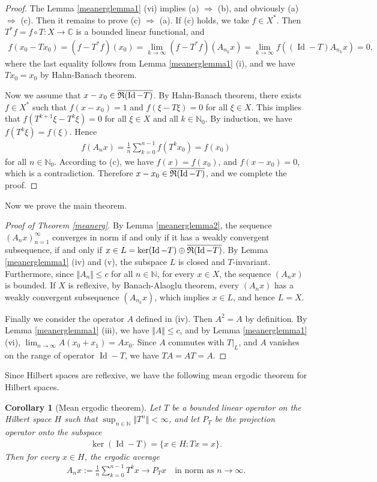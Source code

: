 \documentclass{article}
\numberwithin{equation}{section}
\newcommand{\bbC}{\mathbb{C}}
\newcommand{\bbN}{\mathbb{N}}
\newcommand{\ol}{\overline}
\DeclareMathOperator{\id}{Id}
\theoremstyle{plain}
\newtheorem{corollary}[theorem]{Corollary}
\theoremstyle{definition}
\begin{document}
\begin{proof}
The Lemma \ref{meanerglemma1} (vi) implies (a) $\Rightarrow$ (b), and obviously (a) $\Rightarrow$ (c). Then it remains to prove (c) $\Rightarrow$ (a). If (c) holds, we take $f\in X^*$. Then $T^*f=f\circ T:X\to\bbC$ is a bounded linear functional, and
\begin{align*}
	f(x_0-Tx_0)=(f-T^*f)(x_0)=\lim_{k\to\infty}(f-T^*f)(A_{n_k}x)=\lim_{k\to\infty}f((\id-T)A_{n_k}x)=0,
\end{align*}
where the last equality follows from Lemma \ref{meanerglemma1} (i), and we have $Tx_0=x_0$ by Hahn-Banach theorem. 

Now we assume that $x-x_0\in\ol{\frak{R}(\id-T)}$. By Hahn-Banach theorem, there exists $f\in X^*$ such that $f(x-x_0)=1$ and $f(\xi-T\xi)=0$ for all $\xi\in X$. This implies that $f(T^{k+1}\xi-T^k\xi)=0$ for all $\xi\in X$ and all $k\in\bbN_0$. By induction, we have $f(T^k\xi)=f(\xi)$. Hence
\begin{align*}
	f(A_nx)=\frac{1}{n}\sum_{k=0}^{n-1}f(T^kx_0)=f(x_0)
\end{align*}
for all $n\in\bbN_0$. According to (c), we have $f(x)=f(x_0)$, and $f(x-x_0)=0$, which is a contradiction. Therefore $x-x_0\in\ol{\frak{R}(\id-T)}$, and we complete the proof. 
\end{proof}

Now we prove the main theorem.
\begin{proof}[Proof of Theorem \ref{meanerg}] 
By Lemma \ref{meanerglemma2}, the sequence $(A_n x)_{n=1}^\infty$ converges in norm if and only if it has a weakly convergent subsequence, if and only if $x\in L=\ker(\id-T)\oplus\ol{\frak{R}(\id-T)}$. By Lemma \ref{meanerglemma1} (iv) and (v), the subspace $L$ is closed and $T$-invariant. Furthermore, since $\Vert A_n\Vert\leq c$ for all $n\in\bbN$, for every $x\in X$, the sequence $(A_nx)$ is bounded. If $X$ is reflexive, by Banach-Alaoglu theorem, every $(A_n x)$ has a weakly convergent subsequence $(A_{n_k}x)$, which implies $x\in L$, and hence $L=X$.

Finally we consider the operator $A$ defined in (iv). Then $A^2=A$ by definition. By Lemma \ref{meanerglemma1} (iii), we have $\Vert A\Vert\leq c$, and by Lemma \ref{meanerglemma1} (vi), $\lim_{n\to\infty} A(x_0+x_1)=Ax_0$. Since $A$ commutes with $T|_L$, and $A$ vanishes on the range of operator $\id-T$, we have $TA=AT=A$.
\end{proof}

Since Hilbert spaces are reflexive, we have the following mean ergodic theorem for Hilbert spaces.
\begin{corollary}[Mean ergodic theorem]
Let $T$ be a bounded linear operator on the Hilbert space $H$ such that $\sup_{n\in\bbN}\Vert T^n\Vert<\infty$, and let $P_T$ be the projection operator onto the subspace
\begin{align*}
	\ker(\id-T)=\{x\in H:Tx=x\}.
\end{align*}
Then for every $x\in H$, the ergodic average
\begin{align*}
	A_nx:=\frac{1}{n}\sum_{k=0}^{n-1}T^kx\to P_Tx\quad\text{in norm as $n\to\infty$}.
\end{align*}
\end{corollary}
\end{document}
